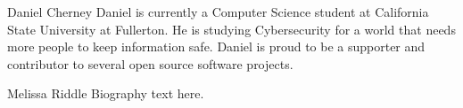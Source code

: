 \documentclass[11pt,journal,compsoc]{IEEEtran}
\begin{document}
% 

\begin{IEEEbiographynophoto}{Daniel Cherney}
Daniel is currently a Computer Science student at California State University at Fullerton. He is studying Cybersecurity for a world that needs more people to keep information safe. Daniel is proud to be a supporter and contributor to several open source software projects. 
\end{IEEEbiographynophoto}

\begin{IEEEbiographynophoto}{Melissa Riddle}
Biography text here.
\end{IEEEbiographynophoto}
\end{document}
